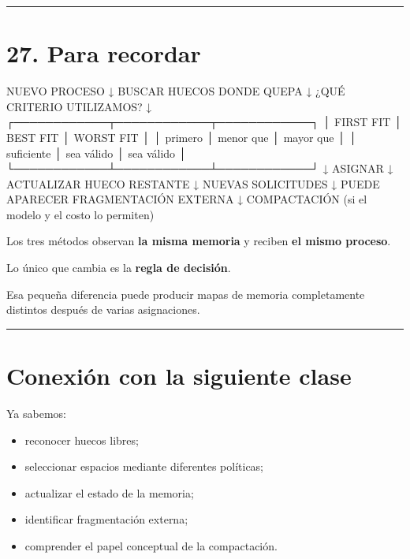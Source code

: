 \documentclass[
  spanish,
  letterpaper,
]{scrbook}
\newenvironment{Shaded}{\begin{snugshade}}{\end{snugshade}}
\newcommand{\NormalTok}[1]{\textcolor[rgb]{0.00,0.23,0.31}{#1}}
\providecommand{\tightlist}{%
  \setlength{\itemsep}{0pt}\setlength{\parskip}{0pt}}
\begin{document}
\begin{center}\rule{0.5\linewidth}{0.5pt}\end{center}


\chapter{27. Para recordar}\label{para-recordar-6}

\begin{Shaded}
\begin{Highlighting}[]
\NormalTok{NUEVO PROCESO}
\NormalTok{      ↓}
\NormalTok{BUSCAR HUECOS DONDE QUEPA}
\NormalTok{      ↓}
\NormalTok{¿QUÉ CRITERIO UTILIZAMOS?}
\NormalTok{      ↓}
\NormalTok{┌────────────┬────────────┬────────────┐}
\NormalTok{│ FIRST FIT  │ BEST FIT   │ WORST FIT  │}
\NormalTok{│ primero    │ menor que  │ mayor que  │}
\NormalTok{│ suficiente │ sea válido │ sea válido │}
\NormalTok{└────────────┴────────────┴────────────┘}
\NormalTok{      ↓}
\NormalTok{ASIGNAR}
\NormalTok{      ↓}
\NormalTok{ACTUALIZAR HUECO RESTANTE}
\NormalTok{      ↓}
\NormalTok{NUEVAS SOLICITUDES}
\NormalTok{      ↓}
\NormalTok{PUEDE APARECER FRAGMENTACIÓN EXTERNA}
\NormalTok{      ↓}
\NormalTok{COMPACTACIÓN (si el modelo y el costo lo permiten)}
\end{Highlighting}
\end{Shaded}

Los tres métodos observan \textbf{la misma memoria} y reciben \textbf{el
mismo proceso}.

Lo único que cambia es la \textbf{regla de decisión}.

Esa pequeña diferencia puede producir mapas de memoria completamente
distintos después de varias asignaciones.

\begin{center}\rule{0.5\linewidth}{0.5pt}\end{center}


\chapter{Conexión con la siguiente
clase}\label{conexiuxf3n-con-la-siguiente-clase-4}

Ya sabemos:

\begin{itemize}
\tightlist
\item
  reconocer huecos libres;
\item
  seleccionar espacios mediante diferentes políticas;
\item
  actualizar el estado de la memoria;
\item
  identificar fragmentación externa;
\item
  comprender el papel conceptual de la compactación.
\end{itemize}
\end{document}

